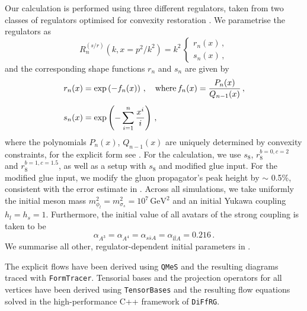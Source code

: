 \documentclass[10pt,prd,superscriptaddress,twocolumn]{revtex4-2}
\begin{document}
Our calculation is performed using three different regulators, taken from two classes of regulators optimised for convexity restoration \cite{Ihssen:2024miv, Sattler:2025hcg}.
We parametrise the regulators as 
%
\begin{equation}
    R^{(s/r)}_n(k,x=p^2/k^2)=k^2\,\begin{cases}
        r_n(x)\,,
        \\[1ex]
        s_n(x)\,,
    \end{cases}
\end{equation}
%
and the corresponding shape functions $r_n$ and $s_n$ are given by
%
\begin{align}
		r_n(x) &= \exp\left({-f_n(x)}\right)\,, \quad\text{where}\, f_n(x) = \frac{P_n(x)}{Q_{n-1}(x)}\,,
\notag\\[1ex]
    	s_n(x) &= \exp\left({-\sum_{i=1}^{n} \frac{x^i}{i}}\right)\,,
\end{align}
%
where the polynomials $P_n(x)$, $Q_{n-1}(x)$ are uniquely determined by convexity constraints, for the explicit form see \cite{Ihssen:2024miv, Sattler:2025hcg}. For the calculation, we use $s_8$, $r_8^{b=0,c=2}$ and $r_8^{b=1,c=1.5}$, as well as a setup with $s_8$ and modified glue input. For the modified glue input, we modify the gluon propagator's peak height by $\sim$ 0.5\%, consistent with the error estimate in \cite{Cyrol:2017qkl}.
Across all simulations, we take uniformly the initial meson mass $m_{\phi_l}^2 = m_{\sigma_s}^2 = 10^7\,\textrm{GeV}^2$ and an initial Yukawa coupling $h_l = h_s = 1$. Furthermore, the initial value of all avatars of the strong coupling is taken to be
%
\begin{equation}
	\alpha_{A^3} = \alpha_{A^4} = \alpha_{s\bar{s}A} = \alpha_{l\bar{l}A} = 0.216
	\,.
\end{equation}
%
We summarise all other, regulator-dependent initial parameters in .

The explicit flows have been derived using \texttt{QMeS}\cite{Pawlowski:2021tkk} and the resulting diagrams traced with \texttt{FormTracer}\cite{Cyrol:2016zqb}. Tensorial bases and the projection operators for all vertices have been derived using \texttt{TensorBases}\cite{Braun:2025gvq} and the resulting flow equations solved in the high-performance C++ framework of \texttt{DiFfRG}\cite{Sattler:2024ozv}.



\end{document}
